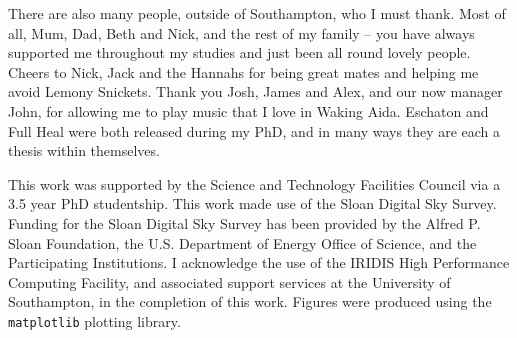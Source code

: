\documentclass[a4paper, 11pt, twoside]{Thesis}  %
\begin{document}
{There are also many people, outside of Southampton, who I must thank.
Most of all, Mum, Dad, Beth and Nick, and the rest of my family -- you have always
supported me throughout my studies and just been all round lovely people.
Cheers to Nick, Jack and the Hannahs for being great mates and helping me avoid 
Lemony Snickets. Thank you Josh, James and Alex, and our now manager John,
for allowing me to play music that I love in Waking Aida. 
Eschaton and Full Heal were both released during my PhD, and in many ways 
they are each a thesis within themselves. 

This work was supported by the Science and Technology Facilities Council
via a 3.5 year PhD studentship. This work made use of the Sloan Digital Sky Survey.
Funding for the Sloan Digital Sky Survey has been provided by
the Alfred P. Sloan Foundation, the U.S. Department of Energy Office of
Science, and the Participating Institutions.
I acknowledge the use of the IRIDIS High Performance Computing 
Facility, and associated support services at the University of 
Southampton, in the completion of this work. 
Figures were produced using the {\tt matplotlib} plotting library.
}

\clearpage
\end{document}
